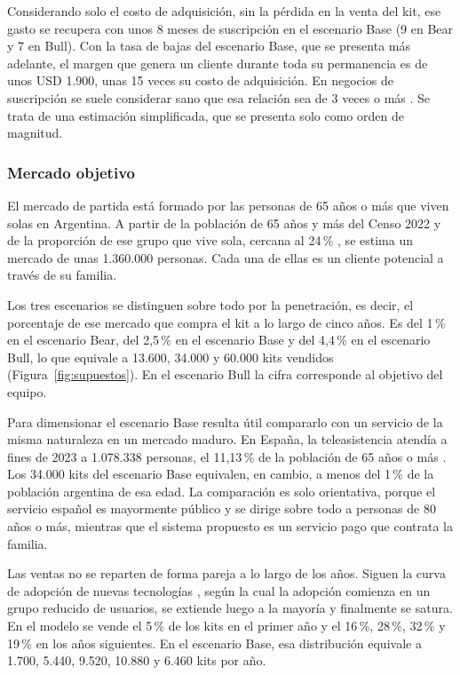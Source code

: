 Considerando solo el costo de adquisición, sin la pérdida en la venta del kit, ese gasto se recupera con unos 8 meses de suscripción en el escenario Base (9 en Bear y 7 en Bull).
Con la tasa de bajas del escenario Base, que se presenta más adelante, el margen que genera un cliente durante toda su permanencia es de unos USD 1.900, unas 15 veces su costo de adquisición.
En negocios de suscripción se suele considerar sano que esa relación sea de 3 veces o más \parencite{Skok2013}.
Se trata de una estimación simplificada, que se presenta solo como orden de magnitud.

\subsubsection{Mercado objetivo}
\label{sec:mercado-objetivo}

El mercado de partida está formado por las personas de 65 años o más que viven solas en Argentina.
A partir de la población de 65 años y más del Censo 2022 \parencite{INDEC2022} y de la proporción de ese grupo que vive sola, cercana al 24\,\% \parencite{TejidoUrbano2025}, se estima un mercado de unas 1.360.000 personas.
Cada una de ellas es un cliente potencial a través de su familia.

Los tres escenarios se distinguen sobre todo por la penetración, es decir, el porcentaje de ese mercado que compra el kit a lo largo de cinco años.
Es del 1\,\% en el escenario Bear, del 2,5\,\% en el escenario Base y del 4,4\,\% en el escenario Bull, lo que equivale a 13.600, 34.000 y 60.000 kits vendidos (Figura~\ref{fig:supuestos}).
En el escenario Bull la cifra corresponde al objetivo del equipo.

Para dimensionar el escenario Base resulta útil compararlo con un servicio de la misma naturaleza en un mercado maduro.
En España, la teleasistencia atendía a fines de 2023 a 1.078.338 personas, el 11,13\,\% de la población de 65 años o más \parencite{Imserso2024}.
Los 34.000 kits del escenario Base equivalen, en cambio, a menos del 1\,\% de la población argentina de esa edad.
La comparación es solo orientativa, porque el servicio español es mayormente público y se dirige sobre todo a personas de 80 años o más, mientras que el sistema propuesto es un servicio pago que contrata la familia.

Las ventas no se reparten de forma pareja a lo largo de los años.
Siguen la curva de adopción de nuevas tecnologías \parencite{Rogers2003}, según la cual la adopción comienza en un grupo reducido de usuarios, se extiende luego a la mayoría y finalmente se satura.
En el modelo se vende el 5\,\% de los kits en el primer año y el 16\,\%, 28\,\%, 32\,\% y 19\,\% en los años siguientes.
En el escenario Base, esa distribución equivale a 1.700, 5.440, 9.520, 10.880 y 6.460 kits por año.

